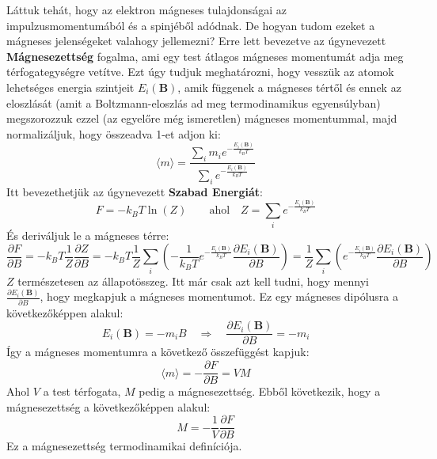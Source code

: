 \documentclass[../main.tex]{subfiles}
\begin{document}
Láttuk tehát, hogy az elektron mágneses tulajdonságai az impulzusmomentumából és a spinjéből adódnak. De hogyan tudom ezeket a mágneses jelenségeket valahogy jellemezni?
Erre lett bevezetve az úgynevezett \textbf{Mágnesezettség} fogalma, ami egy test átlagos mágneses momentumát adja meg térfogategységre vetítve. Ezt úgy tudjuk meghatározni,
hogy vesszük az atomok lehetséges energia szintjeit $E_i(\mathbf{B})$, amik függenek a mágneses tértől és ennek az eloszlását (amit a Boltzmann-eloszlás ad meg termodinamikus egyensúlyban)
megszorozzuk ezzel (az egyelőre még ismeretlen) mágneses momentummal, majd normalizáljuk, hogy összeadva 1-et adjon ki:
\begin{equation}
    \langle m \rangle = \frac{\sum_i m_i e^{-\frac{E_i(\mathbf{B})}{k_B T}}}{\sum_i e^{-\frac{E_i(\mathbf{B})}{k_B T}}}
\end{equation}
Itt bevezethetjük az úgynevezett \textbf{Szabad Energiát}:
\begin{equation}
    F = - k_B T \ln \left( Z \right) \qquad \text{ahol} \quad Z = \sum_i e^{-\frac{E_i(\mathbf{B})}{k_B T}}
\end{equation}
És deriváljuk le a mágneses térre:
\begin{equation}
    \frac{\partial F}{\partial B} = - k_B T \frac{1}{Z} \frac{\partial Z}{\partial B} = - k_B T \frac{1}{Z} \sum_i \left( -\frac{1}{k_B T} e^{-\frac{E_i(\mathbf{B})}{k_B T}} \frac{\partial E_i(\mathbf{B})}{\partial B} \right) = \frac{1}{Z} \sum_i \left( e^{-\frac{E_i(\mathbf{B})}{k_B T}} \frac{\partial E_i(\mathbf{B})}{\partial B} \right)
\end{equation}
$Z$ természetesen az állapotösszeg. Itt már csak azt kell tudni, hogy mennyi $\frac{\partial E_i(\mathbf{B})}{\partial B}$, hogy megkapjuk a mágneses momentumot. Ez egy mágneses dipólusra a következőképpen alakul:
\begin{equation}
    E_i(\mathbf{B}) = - m_i B \quad \Rightarrow \quad \frac{\partial E_i(\mathbf{B})}{\partial B} = - m_i
\end{equation}
Így a mágneses momentumra a következő összefüggést kapjuk:
\begin{equation}
    \langle m \rangle = - \frac{\partial F}{\partial B} = V M
\end{equation}
Ahol $V$ a test térfogata, $M$ pedig a mágnesezettség. Ebből következik, hogy a mágnesezettség a következőképpen alakul:
\begin{equation}
    M = - \frac{1}{V} \frac{\partial F}{\partial B}
\end{equation}
Ez a mágnesezettség termodinamikai definíciója.
\end{document}
